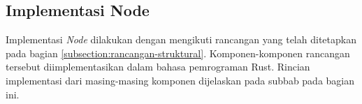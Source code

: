 \subsection{Implementasi Node}
\label{subsection:implementasi-node}

Implementasi \textit{Node} dilakukan dengan mengikuti rancangan yang telah ditetapkan pada bagian \ref{subsection:rancangan-struktural}. Komponen-komponen rancangan tersebut diimplementasikan dalam bahasa pemrograman Rust. Rincian implementasi dari masing-masing komponen dijelaskan pada subbab pada bagian ini.





